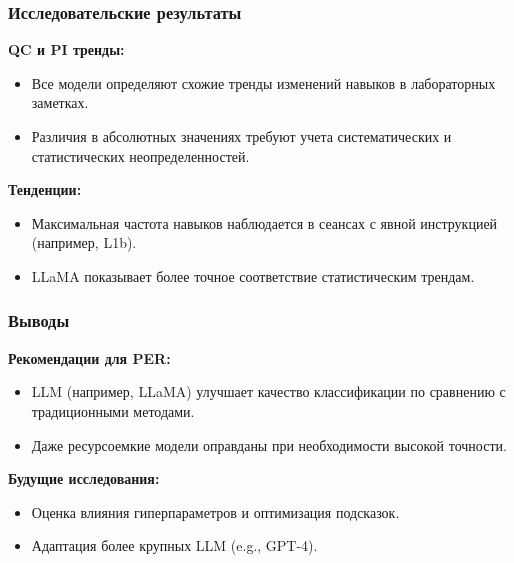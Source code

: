 \documentclass[aspectratio=169]{beamer}
\begin{document}
\begin{frame}
    \frametitle{Исследовательские результаты}
    \textbf{QC и PI тренды:} \\
    \begin{itemize}
        \item Все модели определяют схожие тренды изменений навыков в лабораторных заметках.
        \item Различия в абсолютных значениях требуют учета систематических и статистических неопределенностей.
    \end{itemize}
    \textbf{Тенденции:} \\
    \begin{itemize}
        \item Максимальная частота навыков наблюдается в сеансах с явной инструкцией (например, L1b).
        \item LLaMA показывает более точное соответствие статистическим трендам.
    \end{itemize}
\end{frame}

\begin{frame}
    \frametitle{Выводы}
    \textbf{Рекомендации для PER:} \\
    \begin{itemize}
        \item LLM (например, LLaMA) улучшает качество классификации по сравнению с традиционными методами.
        \item Даже ресурсоемкие модели оправданы при необходимости высокой точности.
    \end{itemize}
    \textbf{Будущие исследования:} \\
    \begin{itemize}
        \item Оценка влияния гиперпараметров и оптимизация подсказок.
        \item Адаптация более крупных LLM (e.g., GPT-4).
    \end{itemize}
\end{frame}
\end{document}
